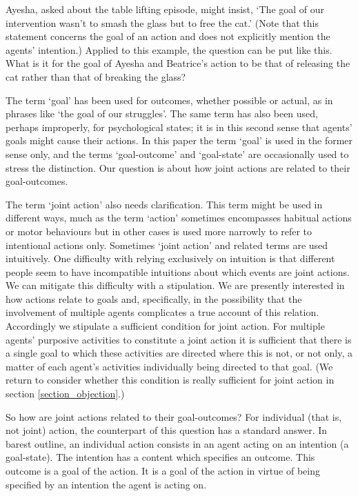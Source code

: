 \documentclass[12pt,a4paper]{extarticle}
\begin{document}
Ayesha, asked about the table lifting episode, might insist, `The goal of our intervention wasn't to smash the glass but to free the cat.'  (Note that this statement concerns the goal of an action and does not explicitly mention the agents' intention.)  Applied to this example, the question can be put like this.  What is it for the goal of Ayesha and Beatrice's action to be that of releasing the cat rather than that of breaking the glass?

The term `goal' has been used for outcomes, whether possible or actual, as in phrases like `the goal of our struggles'.  The same term has also been used, perhaps improperly, for psychological states; it is in this second sense that agents' goals might cause their actions.  In this paper the term `goal' is used in the former sense only, and the terms `goal-outcome' and `goal-state' are occasionally used to stress the distinction.  Our question is about how joint actions are related to their goal-outcomes.  

The term `joint action' also needs clarification.  This term might be used in different ways, much as the term `action' sometimes encompasses habitual actions or motor behaviours but in other cases is used more narrowly to refer to intentional actions only.  
Sometimes `joint action' and related terms are used intuitively.
One difficulty with relying exclusively on intuition is that different people seem to have incompatible intuitions about which events are joint actions.
We can mitigate this difficulty with a stipulation.
We are presently interested in how actions relate to goals and, specifically, in the possibility that the involvement of multiple agents complicates a true account of this relation.  Accordingly we stipulate a sufficient condition for joint action.  For multiple agents' purposive activities to constitute a joint action it is sufficient that there is a single goal to which these activities are directed where this is not, or not only, a matter of each agent's activities individually being directed to that goal.   
(We return to consider whether this condition is really sufficient for joint action in section \vref{section_objection}.)

So how are joint actions related to their goal-outcomes?  For individual (that is, not joint) action, the counterpart of this question has a standard answer.  In barest outline, an individual action consists in an agent acting on an intention (a goal-state).  The intention has a content which specifies an outcome.
This outcome is a goal of the action.
It is a goal of the action in virtue of being specified by an intention the agent is acting on. 
\end{document}

